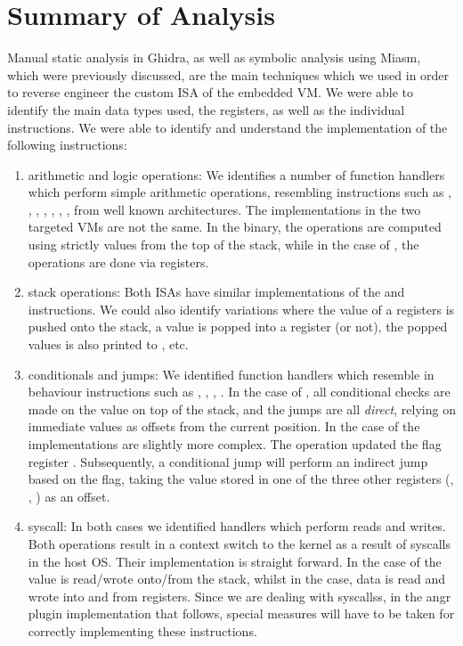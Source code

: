 \section{Summary of Analysis}

Manual static analysis in Ghidra, as well as symbolic analysis using Miasm, which were previously discussed, are the main techniques which we used in order to reverse engineer the custom \gls{ISA} of the embedded \gls{VM}. We were able to identify the main data types used, the registers, as well as the individual instructions. We were able to identify and understand the implementation of the following instructions: 

\begin{enumerate}
    \item arithmetic and logic operations: We identifies a number of function handlers which perform simple arithmetic operations, resembling instructions such as , , , , , , , from well known architectures. The implementations in the two targeted \glspl{VM} are not the same. In the  binary, the operations are computed using strictly values from the top of the stack, while in the case of , the operations are done via registers.
    \item stack operations: Both \glspl{ISA} have similar implementations of the  and  instructions. We could also identify variations where the value of a registers is pushed onto the stack, a value is popped into a register (or not), the popped values is also printed to , etc.
    \item conditionals and jumps: We identified function handlers which resemble in behaviour instructions such as , , , . In the case of , all conditional checks are made on the value on top of the stack, and the jumps are all \emph{direct}, relying on immediate values as offsets from the current position. In the case of  the implementations are slightly more complex. The  operation updated the flag register . Subsequently, a conditional jump will perform an indirect jump based on the  flag, taking the value stored in one of the three other registers  (, , ) as an offset.
    \item \gls{syscall}: In both cases we identified handlers which perform reads and writes. Both operations result in a context switch to the kernel as a result of \glspl{syscall} in the host \gls{OS}. Their implementation is straight forward. In the case of  the value is read/wrote onto/from the stack, whilst in the  case, data is read and wrote into and from registers. Since we are dealing with \glspl{syscalls}, in the angr plugin implementation that follows, special measures will have to be taken for correctly implementing these instructions.

\end{enumerate}
